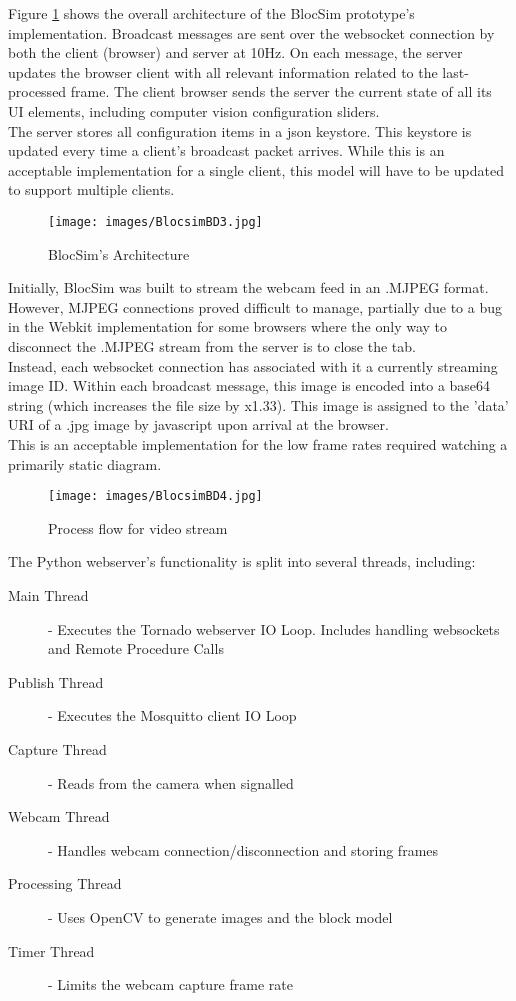 Figure \ref{im:BlocsimBD3} shows the overall architecture of the BlocSim prototype's implementation. Broadcast messages are sent over the websocket connection by both the client (browser) and server at 10Hz. On each message, the server updates the browser client with all relevant information related to the last-processed frame. The client browser sends the server the current state of all its UI elements, including computer vision configuration sliders.
\\

The server stores all configuration items in a json keystore. This keystore is updated every time a client's broadcast packet arrives. While this is an acceptable implementation for a single client, this model will have to be updated to support multiple clients.

\begin{figure}[ht!]
\centering
\texttt{[image: images/BlocsimBD3.jpg]}
\caption{BlocSim's Architecture}
\label{im:BlocsimBD3}
\end{figure}

Initially, BlocSim was built to stream the webcam feed in an .MJPEG format. However, MJPEG connections proved difficult to manage, partially due to a bug in the Webkit implementation for some browsers where the only way to disconnect the .MJPEG stream from the server is to close the tab.
\\

Instead, each websocket connection has associated with it a currently streaming image ID. Within each broadcast message, this image is encoded into a base64 string (which increases the file size by x1.33). This image is assigned to the 'data' URI of a .jpg image by javascript upon arrival at the browser.
\\

This is an acceptable implementation for the low frame rates required watching a primarily static diagram.

\begin{figure}[ht!]
\centering
\texttt{[image: images/BlocsimBD4.jpg]}
\caption{Process flow for video stream}
\label{im:BlocsimBD4}
\end{figure}


\noindent The Python webserver's functionality is split into several threads, including:

\begin{description}
	\item[Main Thread] - Executes the Tornado webserver IO Loop. Includes handling websockets and Remote Procedure Calls
	\item[Publish Thread] - Executes the Mosquitto client IO Loop
	\item[Capture Thread] - Reads from the camera when signalled
	\item[Webcam Thread] - Handles webcam connection/disconnection and storing frames
	\item[Processing Thread] - Uses OpenCV to generate images and the block model
	\item[Timer Thread] - Limits the webcam capture frame rate
\end{description}


